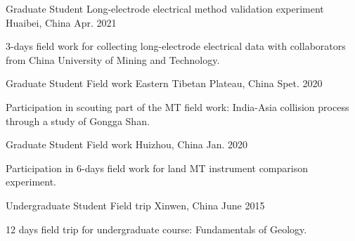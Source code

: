\begin{cventries}
  \cventry
    {Graduate Student} %
    {Long-electrode electrical method validation experiment} %
    {Huaibei, China} %
    {Apr. 2021} %
    {
      \begin{cvitems} %
        \item {3-days field work for collecting long-electrode electrical data with collaborators from China University of Mining and Technology.}
      \end{cvitems}
    }

  \cventry
    {Graduate Student} %
    {Field work} %
    {Eastern Tibetan Plateau, China} %
    {Spet. 2020} %
    {
      \begin{cvitems} %
        \item {Participation in scouting part of the MT field work: India-Asia collision process through a study of Gongga Shan.}
      \end{cvitems}
    }

  \cventry
    {Graduate Student} %
    {Field work} %
    {Huizhou, China} %
    {Jan. 2020} %
    {
      \begin{cvitems} %
        \item {Participation in 6-days field work for land MT instrument comparison experiment.}
      \end{cvitems}
    }

  \cventry
    {Undergraduate Student} %
    {Field trip} %
    {Xinwen, China} %
    {June 2015} %
    {
      \begin{cvitems} %
        \item {12 days field trip for undergraduate course: Fundamentals of Geology.}
      \end{cvitems}
    }

\end{cventries}
